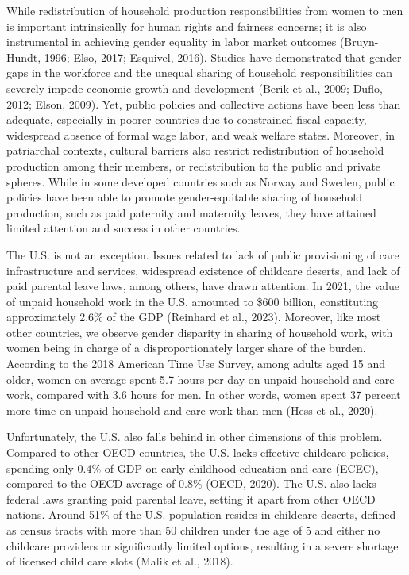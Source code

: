 \documentclass[
  11pt,
]{article}
\begin{document}
While redistribution of household production responsibilities from women
to men is important intrinsically for human rights and fairness
concerns; it is also instrumental in achieving gender equality in labor
market outcomes (Bruyn-Hundt, 1996; Elso, 2017; Esquivel, 2016). Studies
have demonstrated that gender gaps in the workforce and the unequal
sharing of household responsibilities can severely impede economic
growth and development (Berik et al., 2009; Duflo, 2012; Elson, 2009).
Yet, public policies and collective actions have been less than
adequate, especially in poorer countries due to constrained fiscal
capacity, widespread absence of formal wage labor, and weak welfare
states. Moreover, in patriarchal contexts, cultural barriers also
restrict redistribution of household production among their members, or
redistribution to the public and private spheres. While in some
developed countries such as Norway and Sweden, public policies have been
able to promote gender-equitable sharing of household production, such
as paid paternity and maternity leaves, they have attained limited
attention and success in other countries.

The U.S. is not an exception. Issues related to lack of public
provisioning of care infrastructure and services, widespread existence
of childcare deserts, and lack of paid parental leave laws, among
others, have drawn attention. In 2021, the value of unpaid household
work in the U.S. amounted to \$600 billion, constituting approximately
2.6\% of the GDP (Reinhard et al., 2023). Moreover, like most other
countries, we observe gender disparity in sharing of household work,
with women being in charge of a disproportionately larger share of the
burden. According to the 2018 American Time Use Survey, among adults
aged 15 and older, women on average spent 5.7 hours per day on unpaid
household and care work, compared with 3.6 hours for men. In other
words, women spent 37 percent more time on unpaid household and care
work than men (Hess et al., 2020).

Unfortunately, the U.S. also falls behind in other dimensions of this
problem. Compared to other OECD countries, the U.S. lacks effective
childcare policies, spending only 0.4\% of GDP on early childhood
education and care (ECEC), compared to the OECD average of 0.8\% (OECD,
2020). The U.S. also lacks federal laws granting paid parental leave,
setting it apart from other OECD nations. Around 51\% of the U.S.
population resides in childcare deserts, defined as census tracts with
more than 50 children under the age of 5 and either no childcare
providers or significantly limited options, resulting in a severe
shortage of licensed child care slots (Malik et al., 2018).
\end{document}
